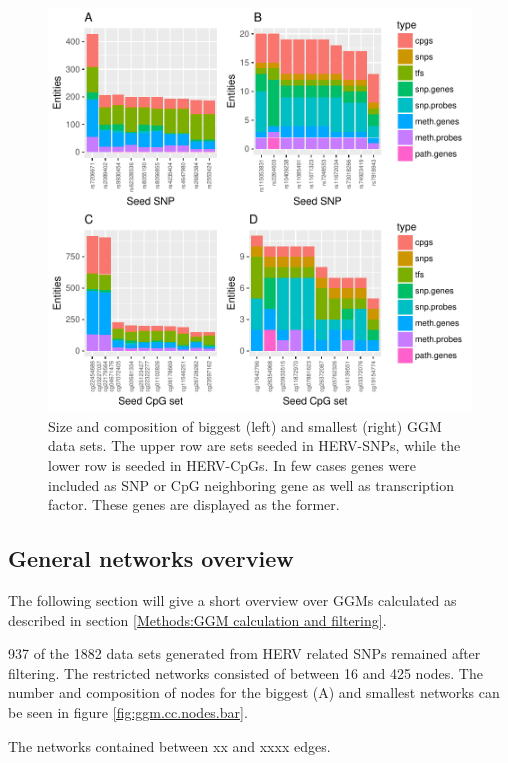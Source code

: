 \documentclass[a4paper,12pt,twoside,openright]{report}
\begin{document}
\begin{figure}[tb]
	\includegraphics[scale = 1, keepaspectratio = true]{../figures/hervS2_ggm_data_entity_bar}  
	\caption{Size and composition of biggest (left) and smallest (right) GGM data sets. The upper row are sets seeded in HERV-SNPs, while the lower row is seeded in HERV-CpGs. In few cases genes were included as SNP or CpG neighboring gene as well as transcription factor. These genes are displayed as the former.}
    \label{fig:ggm.data.entity.bar}
\end{figure}


\subsection{General networks overview}
\label{Results:General networks overview}
The following section will give a short overview over GGMs calculated as described in section \ref{Methods:GGM calculation and filtering}. 

937 of the 1882 data sets generated from HERV related SNPs remained after filtering. The restricted networks consisted of between 16 and 425 nodes. The number and composition of nodes for the biggest (A) and smallest networks can be seen in figure \ref{fig:ggm.cc.nodes.bar}.

The networks contained between xx and xxxx edges. 
\end{document}
